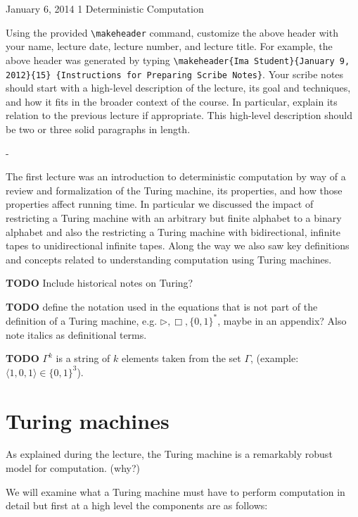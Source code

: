 \documentclass[usletter]{article}
\begin{document}
           {January 6, 2014}           %
           {1}                         %
           {Deterministic Computation} %

\noindent
Using the provided \verb|\makeheader| command,
customize the above header with your name,
lecture date, lecture number, and lecture title. For
example, the above header was generated by typing
\verb|\makeheader{Ima Student}{January 9, 2012}{15}|{\tt
\{Instructions for Preparing Scribe Notes\}}.  Your
scribe notes should start with a high-level description
of the lecture, its goal and techniques, and how it
fits in the broader context of the course. In
particular, explain its relation to the previous
lecture if appropriate.  This high-level description
should be two or three solid paragraphs in length.

-

The first lecture was an introduction to deterministic computation by way of a review and formalization of the Turing machine, its properties, and how those properties affect running time. In particular we discussed the impact of restricting a Turing machine with an arbitrary but finite alphabet to a binary alphabet and also the restricting a Turing machine with bidirectional, infinite tapes to unidirectional infinite tapes. Along the way we also saw key definitions and concepts related to understanding computation using Turing machines.

\textbf{TODO} Include historical notes on Turing?

\textbf{TODO} define the notation used in the equations that is not part of the definition of a Turing machine, e.g. $\rhd, \Box, \{0,1\}^*$, maybe in an appendix? Also note italics as definitional terms.

\textbf{TODO} $\Gamma^{k}$ is a string of $k$ elements taken from the set $\Gamma$, (example: $\langle 1,0,1 \rangle \in \{0,1\}^3$).



\section{Turing machines}

As explained during the lecture, the Turing machine is a remarkably robust model for computation. (why?)

We will examine what a Turing machine must have to perform computation in detail but first at a high level the components are as follows:
\end{document}
